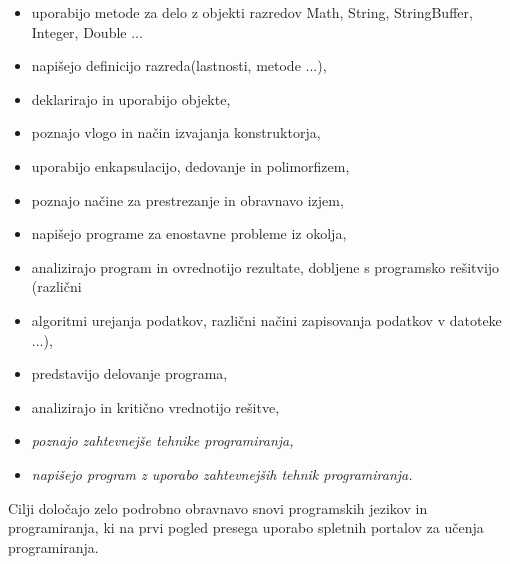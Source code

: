 \begin{itemize}
\item uporabijo metode za delo z objekti razredov Math, String, StringBuffer, Integer, Double ...
\item napišejo definicijo razreda(lastnosti, metode ...),
\item deklarirajo in uporabijo objekte,
\item poznajo vlogo in način izvajanja konstruktorja,
\item uporabijo enkapsulacijo, dedovanje in polimorfizem,
\item poznajo načine za prestrezanje in obravnavo izjem,
\item napišejo programe za enostavne probleme iz okolja,
\item analizirajo program in ovrednotijo rezultate, dobljene s programsko rešitvijo (različni
\item algoritmi urejanja podatkov, različni načini zapisovanja podatkov v datoteke ...),
\item predstavijo delovanje programa,
\item analizirajo in kritično vrednotijo rešitve,
\item \emph{poznajo zahtevnejše tehnike programiranja,}
\item \emph{napišejo program z uporabo zahtevnejših tehnik programiranja.}
\end{itemize}

Cilji določajo zelo podrobno obravnavo snovi programskih jezikov in
programiranja, ki na prvi pogled presega uporabo spletnih portalov za
učenja programiranja.


